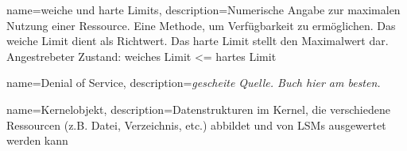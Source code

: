 {%
  name={weiche und harte Limits},
  description={Numerische Angabe zur maximalen Nutzung einer Ressource. Eine Methode, um Verfügbarkeit zu ermöglichen. Das weiche Limit dient als Richtwert. Das harte Limit stellt den Maximalwert dar. Angestrebeter Zustand: weiches Limit \textless= hartes Limit}
}

{%
  name={Denial of Service},
  description={\emph{gescheite Quelle. Buch hier am besten.}}
}

{%
  name={Kernelobjekt},
  description={Datenstrukturen im Kernel, die verschiedene Ressourcen (z.B. Datei, Verzeichnis, etc.) abbildet und von LSMs ausgewertet werden kann \cite{kernelObjects}}
}

